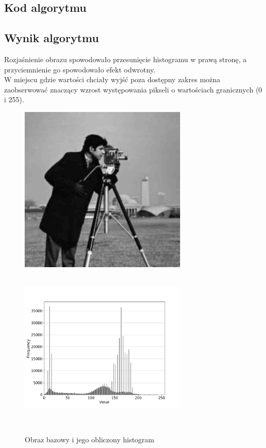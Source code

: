\documentclass[a4paper,12pt]{book}
\begin{document}
\subsection*{Kod algorytmu}

\subsection*{Wynik algorytmu}
Rozjaśnienie obrazu spowodowało przesunięcie histogramu w prawą stronę, a przyciemnienie go spowodowało efekt odwrotny. \\
W miejscu gdzie wartości chciały wyjść poza dostępny zakres można zaobserwować znaczący wzrost występowania pikseli o wartościach granicznych (0 i 255). 

\begin{figure}[H]
	\label{fig:man-moved-histogram}
	\caption{Obraz bazowy i jego obliczony histogram}
	\includegraphics[width=8cm, height=8cm]{man-unmodified.jpg}
	\includegraphics[width=8cm, height=8cm]{5-1/calculate-photoman.png}
	

\end{figure}
\end{document}
